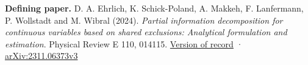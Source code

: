 \textbf{Defining paper.} D. A. Ehrlich, K. Schick-Poland, A. Makkeh, F. Lanfermann, P. Wollstadt and M. Wibral (2024). \emph{Partial information decomposition for continuous variables based on shared exclusions: Analytical formulation and estimation}. Physical Review E 110, 014115. \href{https://doi.org/10.1103/PhysRevE.110.014115}{Version of record} · \href{https://arxiv.org/abs/2311.06373v3}{arXiv:2311.06373v3}
